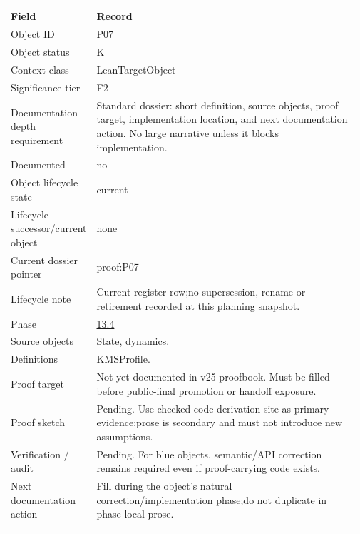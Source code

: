 \begin{longtable}{L{0.16\linewidth} L{0.81\linewidth}}
\hline
\textbf{Field} & \textbf{Record}\\
\hline
Object ID & \hyperlink{object-row-P07}{P07}\\
\hline\addlinespace[0.20em]
Object status & K\\
\hline\addlinespace[0.20em]
Context class & LeanTargetObject\\
\hline\addlinespace[0.20em]
Significance tier & F2\\
\hline\addlinespace[0.20em]
Documentation depth requirement & Standard dossier: short definition, source objects, proof target, implementation location, and next documentation action. No large narrative unless it blocks implementation.\\
\hline\addlinespace[0.20em]
Documented & no\\
\hline\addlinespace[0.20em]
Object lifecycle state & current\\
\hline\addlinespace[0.20em]
Lifecycle successor/\allowbreak{}current object & none\\
\hline\addlinespace[0.20em]
Current dossier pointer & proof:P07\\
\hline\addlinespace[0.20em]
Lifecycle note & Current register row;\newline no supersession, rename or retirement recorded at this planning snapshot.\\
\hline\addlinespace[0.20em]
Phase & \hyperlink{phase-row-13-4}{13.4}\\
\hline\addlinespace[0.20em]
Source objects & State, dynamics.\\
\hline\addlinespace[0.20em]
Definitions & KMSProfile.\\
\hline\addlinespace[0.20em]
Proof target & Not yet documented in v25 proofbook. Must be filled before public-final promotion or handoff exposure.\\
\hline\addlinespace[0.20em]
Proof sketch & Pending. Use checked code derivation site as primary evidence;\newline prose is secondary and must not introduce new assumptions.\\
\hline\addlinespace[0.20em]
Verification /\allowbreak{} audit & Pending. For blue objects, semantic/\allowbreak{}API correction remains required even if proof-carrying code exists.\\
\hline\addlinespace[0.20em]
Next documentation action & Fill during the object's natural correction/\allowbreak{}implementation phase;\newline do not duplicate in phase-local prose.\\
\hline\addlinespace[0.20em]
\end{longtable}
